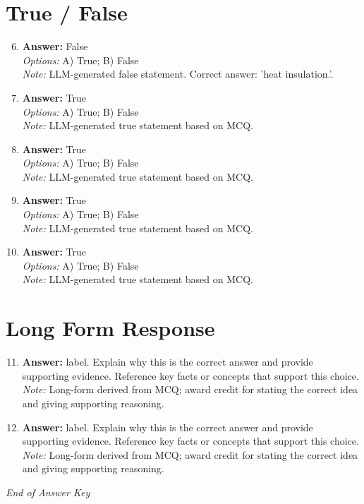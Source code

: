 \documentclass[12pt]{article}
\begin{document}
\section*{True / False}
\begin{enumerate}[label=\arabic*.]
\setcounter{enumi}{5}
\item \textbf{Answer:} False
\\ \textit{Options:} A) True; B) False
\\ \textit{Note:} LLM-generated false statement. Correct answer: 'heat insulation.'.
\item \textbf{Answer:} True
\\ \textit{Options:} A) True; B) False
\\ \textit{Note:} LLM-generated true statement based on MCQ.
\item \textbf{Answer:} True
\\ \textit{Options:} A) True; B) False
\\ \textit{Note:} LLM-generated true statement based on MCQ.
\item \textbf{Answer:} True
\\ \textit{Options:} A) True; B) False
\\ \textit{Note:} LLM-generated true statement based on MCQ.
\item \textbf{Answer:} True
\\ \textit{Options:} A) True; B) False
\\ \textit{Note:} LLM-generated true statement based on MCQ.
\end{enumerate}

\section*{Long Form Response}
\begin{enumerate}[label=\arabic*.]
\setcounter{enumi}{10}
\item \textbf{Answer:} label. Explain why this is the correct answer and provide supporting evidence. Reference key facts or concepts that support this choice.
\\ \textit{Note:} Long-form derived from MCQ; award credit for stating the correct idea and giving supporting reasoning.
\item \textbf{Answer:} label. Explain why this is the correct answer and provide supporting evidence. Reference key facts or concepts that support this choice.
\\ \textit{Note:} Long-form derived from MCQ; award credit for stating the correct idea and giving supporting reasoning.
\end{enumerate}

\vfill
\noindent\textit{End of Answer Key}
\end{document}
